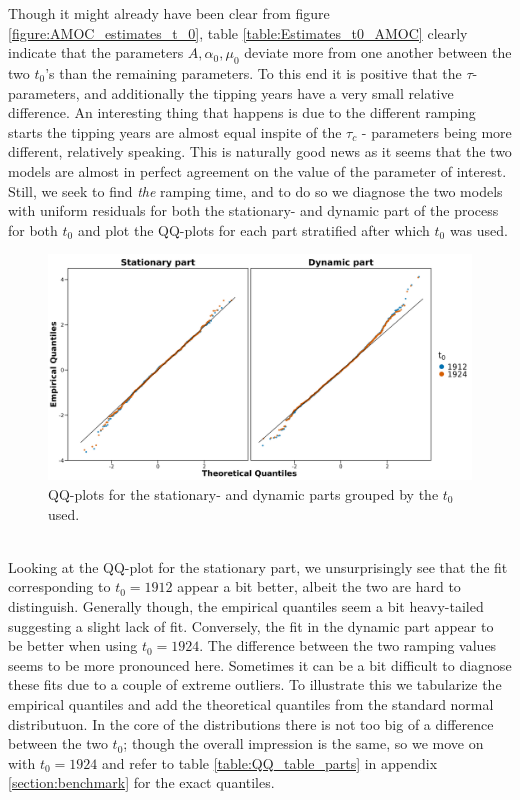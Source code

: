 Though it might already have been clear from figure \ref{figure:AMOC_estimates_t_0}, table \ref{table:Estimates_t0_AMOC} clearly indicate that the parameters $A, \alpha_0, \mu_0$ deviate more from one another between the two $t_0$'s than the remaining parameters. To this end it is positive that the $\tau$-parameters, and additionally the tipping years have a very small relative difference. An interesting thing that happens is due to the different ramping starts the tipping years are almost equal inspite of the $\tau_c$ - parameters being more different, relatively speaking. This is naturally good news as it seems that the two models are almost in perfect agreement on the value of the parameter of interest. Still, we seek to find \textit{the} ramping time, and to do so we diagnose the two models with uniform residuals for both the stationary- and dynamic part of the process for both $t_0$ and plot the QQ-plots for each part stratified after which $t_0$ was used.
\begin{figure}[h!]
    \begin{center}
        \includegraphics[scale = .09]{figures/QQ_plot_parts.jpeg}
        \caption{QQ-plots for the stationary- and dynamic parts grouped by the $t_0$ used.}
        \label{figure:AMOC_QQ_t_0}
    \end{center}
\end{figure}\\
Looking at the QQ-plot for the stationary part, we unsurprisingly see that the fit corresponding to $t_0 = 1912$ appear a bit better, albeit the two are hard to distinguish. Generally though, the empirical quantiles seem a bit heavy-tailed suggesting a slight lack of fit. Conversely, the fit in the dynamic part appear to be better when using $t_0 = 1924$. The difference between the two ramping values seems to be more pronounced here. Sometimes it can be a bit difficult to diagnose these fits due to a couple of extreme outliers. To illustrate this we tabularize the empirical quantiles and add the theoretical quantiles from the standard normal distributuon. In the core of the distributions there is not too big of a difference between the two $t_0$; though the overall impression is the same, so we move on with $t_0 = 1924$ and refer to table \ref{table:QQ_table_parts} in appendix \ref{section:benchmark} for the exact quantiles.
